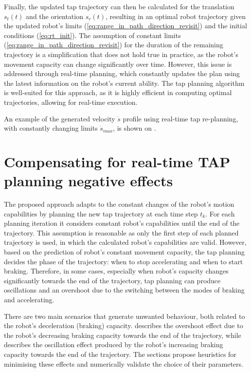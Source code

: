 Finally, the updated \gls{tap} trajectory can then be calculated for the translation $s_t(t)$ and the orientation $s_r(t)$, resulting in an optimal robot trajectory given the updated robot's limits (\ref{eq:range_in_path_direction_revisit}) and the initial conditions (\ref{eq:rt_init}). 
The assumption of constant limits (\ref{eq:range_in_path_direction_revisit}) for the duration of the remaining trajectory is a simplification that does not hold true in practice, as the robot's movement capacity can change significantly over time. However, this issue is addressed through real-time planning, which constantly updates the plan using the latest information on the robot's current ability. The \gls{tap} planning algorithm is well-suited for this approach, as it is highly efficient in computing optimal trajectories, allowing for real-time execution. 

An example of the generated velocity $\dot{s}$ profile using real-time \gls{tap} re-planning, with constantly changing limits $\dot{s}_{max}$, is shown on . 

\section{Compensating for real-time TAP planning negative effects}
\label{ch:heuristics}
The proposed approach adapts to the constant changes of the robot's motion capabilities by planning the new \gls{tap} trajectory at each time step $t_k$. For each planning iteration it considers constant robot's capabilities until the end of the trajectory. This assumption is reasonable as only the first step of each planned trajectory is used, in which the calculated robot's capabilities are valid. 
However, based on the prediction of robot's constant movement capacity, the \gls{tap} planning decides the phase of the trajectory: when to stop accelerating and when to start braking. Therefore, in some cases, especially when robot's capacity changes significantly towards the end of the trajectory, \gls{tap} planning can produce oscillations and an overshoot due to the switching between the modes of braking and accelerating.
 
There are two main scenarios that generate unwanted behaviour, both related to the robot's deceleration (braking) capacity. 
 describes the overshoot effect due to the robot's decreasing braking capacity towards the end of the trajectory, while  describes the oscillation effect produced by the robot's increasing braking capacity towards the end of the trajectory. The sections propose heuristics for minimising these effects and numerically validate the choice of their parameters.

